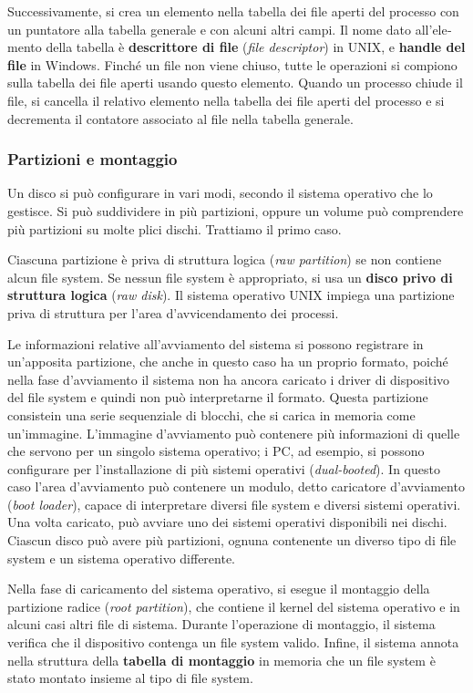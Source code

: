 \documentclass[11pt,a4paper]{article}
\begin{document}
{Successivamente, si crea un elemento nella tabella dei file aperti del processo con un
puntatore alla tabella generale e con alcuni altri campi. Il nome dato all'ele­mento della tabella è \textbf{descrittore di file} (\emph{file descriptor}) in UNIX, e \textbf{handle del file} in Windows. Finché un file non viene chiuso, tutte le operazioni si compiono sulla tabella dei
file aperti usando questo elemento. Quando un processo chiude il file, si cancella il relativo elemento nella tabella dei file
aperti del processo e si decrementa il contatore associato al file nella tabella generale.

\subsubsection{Partizioni e montaggio}
Un disco si può configurare in vari modi, secondo il sistema operativo che lo gestisce. Si può
suddividere in più partizioni, oppure un volume può comprendere più partizioni su molte­
plici dischi. Trattiamo il primo caso.

Ciascuna partizione è priva di struttura logica (\emph{raw partition}) se non contiene alcun fi­le system. Se nessun file system è appropriato, si usa un \textbf{disco privo di struttura logica} (\emph{raw
disk}). Il sistema operativo UNIX impiega una partizione priva di struttura per l'area d'avvicendamento dei processi.

Le informazioni relative all'avviamento del sistema si possono registrare in un'apposi­ta partizione, che anche in questo caso ha un proprio formato, poiché nella fase d'avvia­mento il sistema non ha ancora caricato i driver di dispositivo del file system e quindi non
può interpretarne il formato. Questa partizione consistein una serie sequenziale di
blocchi, che si carica in memoria come un'immagine. L'immagine d'avviamento può conte­nere più informazioni di quelle che servono per un singolo sistema operativo; i PC, ad esem­pio, si possono configurare per l'installazione di più sistemi operativi (\emph{dual-booted}). In questo caso l'area d'avviamento può contenere un modulo, detto caricatore d'av­viamento (\emph{boot loader}), capace di interpretare diversi file system e diversi sistemi operativi. Una volta caricato, può avviare uno dei sistemi operativi disponibili nei dischi. Ciascun di­sco può avere più partizioni, ognuna contenente un diverso tipo di file system e un sistema operativo differente.

Nella fase di caricamento del sistema operativo, si esegue il montaggio della partizione
radice (\emph{root partition}), che contiene il kernel del sistema operativo e in alcuni casi altri file di sistema. Durante l'operazione di montaggio, il sistema verifica che il dispositivo contenga un file system vali­do. Infine, il siste­ma annota nella struttura della \textbf{tabella di montaggio} in memoria che un file system è stato montato insieme al tipo di file system.

}
\end{document}
